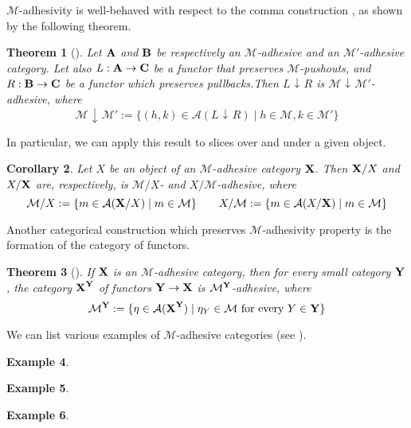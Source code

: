 \documentclass[a4paper]{article}
\def\A{\textbf {\textup{A}}}
\def\B{\textbf {\textup{B}}}
\def\C{\textbf {\textup{C}}}
\def\X{\textbf {\textup{X}}}
\def\Y{\textbf {\textup{Y}}}
\newcommand{\comma}[2]{#1\hspace{1pt} {\downarrow}\hspace{1pt} #2}
\newcommand{\cma}[2]{\mathcal{#1}\hspace{1pt} {\downarrow}\hspace{1pt} \mathcal{#2}}
\newtheorem{theorem}{Theorem}[section]
\newtheorem{corollary}[theorem]{Corollary}
\theoremstyle{definition}
\newtheorem{example}[theorem]{Example}
\begin{document}
$\mathcal{M}$-adhesivity is well-behaved with respect to  the comma construction \cite{mac2013categories}, as shown by the following theorem.
\begin{theorem}[\cite{ehrig2006fundamentals,lack2005adhesive}]\label{lem:comma}
	Let $\A$ and $\B$ be respectively an $\mathcal{M}$-adhesive and an $\mathcal{M}'$-adhesive category. Let also $L:\A\rightarrow \C$ be a functor that preserves $\mathcal{M}$-pushouts, and  $R:\B\rightarrow \C$ be a functor which preserves pullbacks.Then $\comma{L}{R}$ is $\cma{M}{M'}$-adhesive, where 
	\[
	\cma{M}{M}':=\{(h,k)\in \mathcal{A}(\comma{L}{R}) \mid h\in \mathcal{M}, k\in \mathcal{M}'\}\]
\end{theorem}

In particular, we can apply this result to slices over and under a given object.

\begin{corollary}\label{cor:slice}
	Let  $X$ be an object of an $\mathcal{M}$-adhesive category $\X$. Then  $\X/X$ and $X/\X$ are, respectively, is $\mathcal{M}/X$- and $X/\mathcal{M}$-adhesive, where
	\[\mathcal{M}/X:=\{m\in  \mathcal{A}(\X/X) \mid m\in \mathcal{M} \} \qquad X/\mathcal{M}:=\{m\in  \mathcal{A}(X/\X) \mid m\in \mathcal{M} \}\]
\end{corollary}


Another categorical construction which preserves $\mathcal{M}$-adhesivity property is the formation of the category of functors.

\begin{theorem}[\cite{ehrig2006fundamentals,lack2005adhesive}]\label{thm:functors}
If $\X$ is an $\mathcal{M}$-adhesive category, then for every small category $\Y$, the category $\X^\Y$  of functors $\Y\to \X$ is $\mathcal{M}^{\Y}$-adhesive, where
\[\mathcal{M}^{\Y}:=\{\eta \in \mathcal{A}(\X^\Y) \mid \eta_Y \in \mathcal{M} \text{ for every } Y\in \Y\}\]
\end{theorem}

We can list various examples of $\mathcal{M}$-adhesive categories (see \cite{castelnovo2023thesis,CastelnovoGM22,lack2006toposes}).

\begin{example}
\end{example}

\begin{example}
\end{example}


\begin{example}
\end{example}
\end{document}
